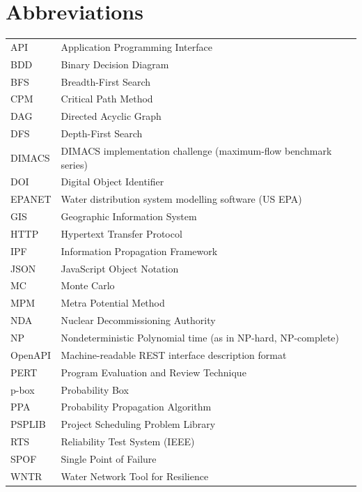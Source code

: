 \documentclass[a4paper,oneside,11pt]{book}
\begin{document}
\section*{Abbreviations}
\begin{tabular}{ll}
    API     & Application Programming Interface \\
    BDD     & Binary Decision Diagram \\
    BFS     & Breadth-First Search \\
    CPM     & Critical Path Method \\
    DAG     & Directed Acyclic Graph \\
    DFS     & Depth-First Search \\
    DIMACS  & DIMACS implementation challenge (maximum-flow benchmark series) \\
    DOI     & Digital Object Identifier \\
    EPANET  & Water distribution system modelling software (US EPA) \\
    GIS     & Geographic Information System \\
    HTTP    & Hypertext Transfer Protocol \\
    IPF     & Information Propagation Framework \\
    JSON    & JavaScript Object Notation \\
    MC      & Monte Carlo \\
    MPM     & Metra Potential Method \\
    NDA     & Nuclear Decommissioning Authority \\
    NP      & Nondeterministic Polynomial time (as in NP-hard, NP-complete) \\
    OpenAPI & Machine-readable REST interface description format \\
    PERT    & Program Evaluation and Review Technique \\
    p-box   & Probability Box \\
    PPA     & Probability Propagation Algorithm \\
    PSPLIB  & Project Scheduling Problem Library \\
    RTS     & Reliability Test System (IEEE) \\
    SPOF    & Single Point of Failure \\
    WNTR    & Water Network Tool for Resilience \\
\end{tabular}

\vspace{0.5cm}
\end{document}
